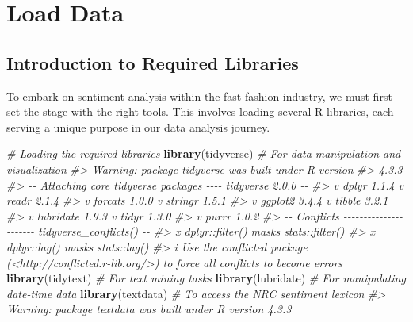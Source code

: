 \documentclass[
]{book}
\newenvironment{Shaded}{\begin{snugshade}}{\end{snugshade}}
\newcommand{\CommentTok}[1]{\textcolor[rgb]{0.56,0.35,0.01}{\textit{#1}}}
\newcommand{\FunctionTok}[1]{\textcolor[rgb]{0.13,0.29,0.53}{\textbf{#1}}}
\newcommand{\NormalTok}[1]{#1}
\begin{document}
\hypertarget{load-data}{%
\section{Load Data}\label{load-data}}

\hypertarget{introduction-to-required-libraries-1}{%
\subsection*{Introduction to Required Libraries}\label{introduction-to-required-libraries-1}}

To embark on sentiment analysis within the fast fashion industry, we must first set the stage with the right tools. This involves loading several R libraries, each serving a unique purpose in our data analysis journey.

\begin{Shaded}
\begin{Highlighting}[]
\CommentTok{\# Loading the required libraries}
\FunctionTok{library}\NormalTok{(tidyverse)  }\CommentTok{\# For data manipulation and visualization}
\CommentTok{\#\textgreater{} Warning: package \textquotesingle{}tidyverse\textquotesingle{} was built under R version}
\CommentTok{\#\textgreater{} 4.3.3}
\CommentTok{\#\textgreater{} {-}{-} Attaching core tidyverse packages {-}{-}{-}{-} tidyverse 2.0.0 {-}{-}}
\CommentTok{\#\textgreater{} v dplyr     1.1.4     v readr     2.1.4}
\CommentTok{\#\textgreater{} v forcats   1.0.0     v stringr   1.5.1}
\CommentTok{\#\textgreater{} v ggplot2   3.4.4     v tibble    3.2.1}
\CommentTok{\#\textgreater{} v lubridate 1.9.3     v tidyr     1.3.0}
\CommentTok{\#\textgreater{} v purrr     1.0.2     }
\CommentTok{\#\textgreater{} {-}{-} Conflicts {-}{-}{-}{-}{-}{-}{-}{-}{-}{-}{-}{-}{-}{-}{-}{-}{-}{-}{-}{-}{-}{-} tidyverse\_conflicts() {-}{-}}
\CommentTok{\#\textgreater{} x dplyr::filter() masks stats::filter()}
\CommentTok{\#\textgreater{} x dplyr::lag()    masks stats::lag()}
\CommentTok{\#\textgreater{} i Use the conflicted package (\textless{}http://conflicted.r{-}lib.org/\textgreater{}) to force all conflicts to become errors}
\FunctionTok{library}\NormalTok{(tidytext)   }\CommentTok{\# For text mining tasks}
\FunctionTok{library}\NormalTok{(lubridate)  }\CommentTok{\# For manipulating date{-}time data}
\FunctionTok{library}\NormalTok{(textdata)   }\CommentTok{\# To access the NRC sentiment lexicon}
\CommentTok{\#\textgreater{} Warning: package \textquotesingle{}textdata\textquotesingle{} was built under R version 4.3.3}
\end{Highlighting}
\end{Shaded}
\end{document}
